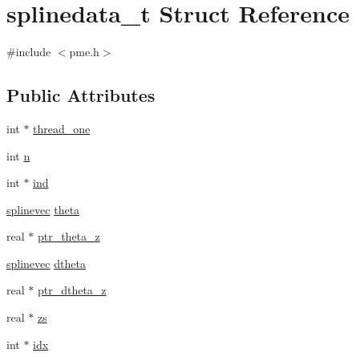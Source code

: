 \hypertarget{structsplinedata__t}{\section{splinedata\-\_\-t \-Struct \-Reference}
\label{structsplinedata__t}
}


{\ttfamily \#include $<$pme.\-h$>$}

\subsection*{\-Public \-Attributes}
\begin{DoxyCompactItemize}
\item 
int $\ast$ \hyperlink{structsplinedata__t_af7586d3accc23944898f11bb1bdc8137}{thread\-\_\-one}
\item 
int \hyperlink{structsplinedata__t_a629e34902157e899332f14475fa19587}{n}
\item 
int $\ast$ \hyperlink{structsplinedata__t_a78f732f5e13dbad487d6bcc7506495d6}{ind}
\item 
\hyperlink{share_2template_2gromacs_2pme_8h_ae5d0a776903d496601b806a5750a220a}{splinevec} \hyperlink{structsplinedata__t_a756d0aca539ab64fdb38fe6333fb7d6a}{theta}
\item 
real $\ast$ \hyperlink{structsplinedata__t_a432fb23e540f7ccc0932a63be32972a8}{ptr\-\_\-theta\-\_\-z}
\item 
\hyperlink{share_2template_2gromacs_2pme_8h_ae5d0a776903d496601b806a5750a220a}{splinevec} \hyperlink{structsplinedata__t_a9c027d34817c91f4ecb9cff67066215c}{dtheta}
\item 
real $\ast$ \hyperlink{structsplinedata__t_aae3ba219aa493497b29eda90f7871c6b}{ptr\-\_\-dtheta\-\_\-z}
\item 
real $\ast$ \hyperlink{structsplinedata__t_a69bb41a5bb5128dbcb57122fd60c6a0b}{zs}
\item 
int $\ast$ \hyperlink{structsplinedata__t_a3fb4637364000e0161a6c9d05de2013b}{idx}
\end{DoxyCompactItemize}



